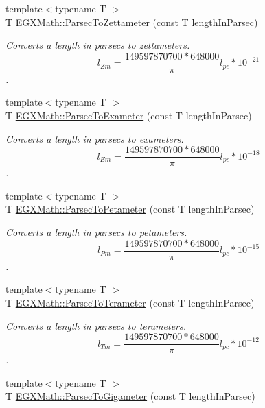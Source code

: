 \begin{DoxyCompactItemize}
{\footnotesize template$<$typename T $>$ }\\T \mbox{\hyperlink{group___e_g_x_math-_conversions-_length_conversions-_astronomical-_parsec-_s_i_gad7d13308de04663badf7e5ea4021b43f}{E\+G\+X\+Math\+::\+Parsec\+To\+Zettameter}} (const T length\+In\+Parsec)
\begin{DoxyCompactList}\small\item\em Converts a length in parsecs to zettameters. \[ l_{Zm}=\frac{149597870700 * 648000}{\pi}l_{pc} * 10^{-21} \]. \end{DoxyCompactList}\item 
{\footnotesize template$<$typename T $>$ }\\T \mbox{\hyperlink{group___e_g_x_math-_conversions-_length_conversions-_astronomical-_parsec-_s_i_ga598f46c20868c84cf76fd6f934620728}{E\+G\+X\+Math\+::\+Parsec\+To\+Exameter}} (const T length\+In\+Parsec)
\begin{DoxyCompactList}\small\item\em Converts a length in parsecs to exameters. \[ l_{Em}=\frac{149597870700 * 648000}{\pi}l_{pc} * 10^{-18} \]. \end{DoxyCompactList}\item 
{\footnotesize template$<$typename T $>$ }\\T \mbox{\hyperlink{group___e_g_x_math-_conversions-_length_conversions-_astronomical-_parsec-_s_i_ga9902983ed9563d247c8701370a95eb55}{E\+G\+X\+Math\+::\+Parsec\+To\+Petameter}} (const T length\+In\+Parsec)
\begin{DoxyCompactList}\small\item\em Converts a length in parsecs to petameters. \[ l_{Pm}=\frac{149597870700 * 648000}{\pi}l_{pc} * 10^{-15} \]. \end{DoxyCompactList}\item 
{\footnotesize template$<$typename T $>$ }\\T \mbox{\hyperlink{group___e_g_x_math-_conversions-_length_conversions-_astronomical-_parsec-_s_i_gafa04d007102c3b440653c9c0460b0cd8}{E\+G\+X\+Math\+::\+Parsec\+To\+Terameter}} (const T length\+In\+Parsec)
\begin{DoxyCompactList}\small\item\em Converts a length in parsecs to terameters. \[ l_{Tm}=\frac{149597870700 * 648000}{\pi}l_{pc} * 10^{-12} \]. \end{DoxyCompactList}\item 
{\footnotesize template$<$typename T $>$ }\\T \mbox{\hyperlink{group___e_g_x_math-_conversions-_length_conversions-_astronomical-_parsec-_s_i_ga8b4677ca02eae3ff100d1cdca6ae2392}{E\+G\+X\+Math\+::\+Parsec\+To\+Gigameter}} (const T length\+In\+Parsec)

\end{DoxyCompactItemize}
